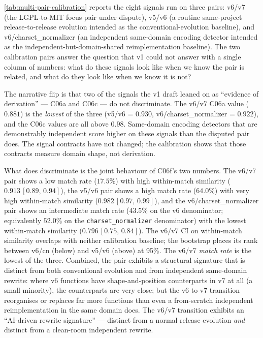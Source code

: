 \documentclass[11pt,letterpaper]{article}
\begin{document}
\cref{tab:multi-pair-calibration} reports the eight signals run
on three pairs: v6/v7 (the LGPL-to-MIT focus pair under dispute),
v5/v6 (a routine same-project release-to-release evolution
intended as the conventional-evolution baseline), and
v6/charset\_normalizer (an independent same-domain encoding
detector intended as the independent-but-domain-shared
reimplementation baseline). The two calibration pairs answer the
question that v1 could not answer with a single column of
numbers: what do these signals look like when we know the pair is
related, and what do they look like when we know it is not?

The narrative flip is that two of the signals the v1 draft
leaned on as ``evidence of derivation'' --- C06a and C06c --- do
not discriminate. The v6/v7 C06a value ($0.881$) is the
\emph{lowest} of the three (v5/v6 = $0.930$,
v6/charset\_normalizer = $0.922$), and the C06c values are all
above $0.98$. Same-domain encoding detectors that are
demonstrably independent score higher on these signals than the
disputed pair does. The signal contracts have not changed; the
calibration shows that those contracts measure domain shape, not
derivation.

What does discriminate is the joint behaviour of C06f's two
numbers. The v6/v7 pair shows a low match rate ($17.5\%$) with
high within-match similarity ($0.913\,[0.89,\,0.94]$), the
v5/v6 pair shows a high match rate ($64.0\%$) with very high
within-match similarity ($0.982\,[0.97,\,0.99]$), and the
v6/charset\_normalizer pair shows an intermediate match rate
($43.5\%$ on the v6 denominator; equivalently $52.0\%$ on the
\texttt{charset\_normalizer} denominator) with the lowest
within-match similarity
($0.796\,[0.75,\,0.84]$). The v6/v7 CI on within-match similarity
overlaps with neither calibration baseline; the bootstrap places
its rank between v6/cn (below) and v5/v6 (above) at 95\%. The
v6/v7 \emph{match rate} is the lowest of the three. Combined,
the pair exhibits a structural signature that is distinct from
both conventional evolution and from independent same-domain
rewrite: where v6 functions have shape-and-position counterparts
in v7 at all (a small minority), the counterparts are very close;
but the v6 to v7 transition reorganises or replaces far more
functions than even a from-scratch independent reimplementation
in the same domain does. The v6/v7 transition exhibits an
``AI-driven rewrite signature'' --- distinct from a normal release
evolution \emph{and} distinct from a clean-room independent rewrite.
\end{document}
